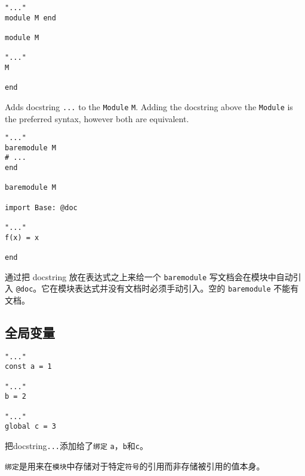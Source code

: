 \begin{verbatim}
"..."
module M end

module M

"..."
M

end
\end{verbatim}



Adds docstring \texttt{{\textquotedbl}...{\textquotedbl}} to the \texttt{Module} \texttt{M}. Adding the docstring above the \texttt{Module} is the preferred syntax, however both are equivalent.




\begin{verbatim}
"..."
baremodule M
# ...
end

baremodule M

import Base: @doc

"..."
f(x) = x

end
\end{verbatim}



通过把 docstring 放在表达式之上来给一个 \texttt{baremodule} 写文档会在模块中自动引入 \texttt{@doc}。它在模块表达式并没有文档时必须手动引入。空的 \texttt{baremodule} 不能有文档。



\hypertarget{17299710876257759093}{}


\subsection{全局变量}




\begin{verbatim}
"..."
const a = 1

"..."
b = 2

"..."
global c = 3
\end{verbatim}



把docstring\texttt{{\textquotedbl}...{\textquotedbl}}添加给了\texttt{绑定} \texttt{a}，\texttt{b}和\texttt{c}。



\texttt{绑定}是用来在\texttt{模块}中存储对于特定\texttt{符号}的引用而非存储被引用的值本身。



